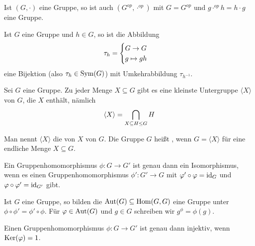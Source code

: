 \begin{example}
	Ist $(G,\cdot)$ eine Gruppe, so ist auch $(G^{op},\cdot^{op})$ mit $G=G^{op}$ und $g\cdot^{op}h=h\cdot g$ eine Gruppe.
\end{example}

\begin{remark}
	Ist $G$ eine Gruppe und $h\in G$, so ist die Abbildung
	\begin{align}
		\tau_h=\begin{cases}
			G\to G \\ g\mapsto gh
		\end{cases}\notag
	\end{align}
	eine Bijektion (also $\tau_h\in\operatorname{Sym}(G)$) mit Umkehrabbildung $\tau_{h^{-1}}$.
\end{remark}

\begin{proposition}
	Sei $G$ eine Gruppe. Zu jeder Menge $X\subseteq G$ gibt es eine kleinste Untergruppe $\langle X\rangle$ von $G$, die $X$ enthält, nämlich
	\begin{align}
		\langle X\rangle = \bigcap_{X\subseteq H\le G} H\notag
	\end{align} 
\end{proposition}

\begin{remark}
	Man nennt $\langle X\rangle$ die von $X$  von $G$. Die Gruppe $G$ heißt , wenn $G=\langle X\rangle$ für eine endliche Menge $X\subseteq G$.
\end{remark}

\begin{proposition}
	Ein Gruppenhomomorphismus $\phi:G\to G'$ ist genau dann ein Isomorphismus, wenn es einen Gruppenhomomorphismus $\phi':G'\to G$ mit $\varphi'\circ\varphi=\operatorname{id}_G$ und $\varphi\circ\varphi'=\operatorname{id}_{G'}$ gibt.
\end{proposition}

\begin{example}
	Ist $G$ eine Gruppe, so bilden die  $\operatorname{Aut}(G)\subseteq\operatorname{Hom}(G,G)$ eine Gruppe unter $\phi\circ\phi'=\phi'\circ\phi$. Für $\varphi\in\operatorname{Aut}(G)$ und $g\in G$ schreiben wir $g^\phi=\phi(g)$.
\end{example}

\begin{proposition}
	Einen Gruppenhomomorphismus $\phi:G\to G'$ ist genau dann injektiv, wenn $\operatorname{Ker}(\varphi)=1$.
\end{proposition}

